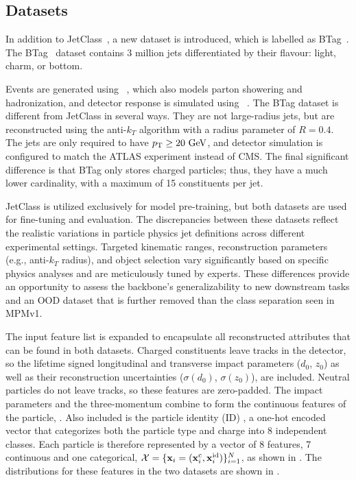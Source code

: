 \subsection{Datasets}

In addition to JetClass~\cite{JetClass}, a new dataset is introduced, which is labelled as BTag~\cite{btag}.
The BTag~\cite{btag} dataset contains 3 million jets differentiated by their flavour: light, charm, or bottom.

Events are generated using \pythia~\cite{Pythia8}, which also models parton showering and hadronization, and detector response is simulated using \delphes~\cite{Delphes}.
The BTag dataset is different from JetClass in several ways.
They are not large-radius jets, but are reconstructed using the anti-$k_T$ algorithm with a radius parameter of $R=0.4$.
The jets are only required to have $\pt \geq 20~\GeV$, and detector simulation is configured to match the ATLAS experiment instead of CMS.
The final significant difference is that BTag only stores charged particles; thus, they have a much lower cardinality, with a maximum of 15 constituents per jet.

JetClass is utilized exclusively for model pre-training, but both datasets are used for fine-tuning and evaluation.
The discrepancies between these datasets reflect the realistic variations in particle physics jet definitions across different experimental settings.
Targeted kinematic ranges, reconstruction parameters (e.g., anti-$k_T$ radius), and object selection vary significantly based on specific physics analyses and are meticulously tuned by experts.
These differences provide an opportunity to assess the backbone's generalizability to new downstream tasks and an OOD dataset that is further removed than the class separation seen in MPMv1.

The input feature list is expanded to encapsulate all reconstructed attributes that can be found in both datasets.
Charged constituents leave tracks in the detector, so the lifetime signed longitudinal and transverse impact parameters ($d_0$, $z_0$) as well as their reconstruction uncertainties ($\sigma(d_0)$, $\sigma(z_0)$), are included.
Neutral particles do not leave tracks, so these features are zero-padded.
The impact parameters and the three-momentum combine to form the continuous features of the particle, \xc.
Also included is the particle identity (ID) \xid, a one-hot encoded vector that categorizes both the particle type and charge into 8 independent classes.
Each particle is therefore represented by a vector of 8 features, 7 continuous and one categorical, $\mathcal{X} = \{\mathbf{x}_i=(\mathbf{x}^\text{c}_i, \mathbf{x}^\text{id}_i)\}_{i=1}^N$, as shown in .
The distributions for these features in the two datasets are shown in .

